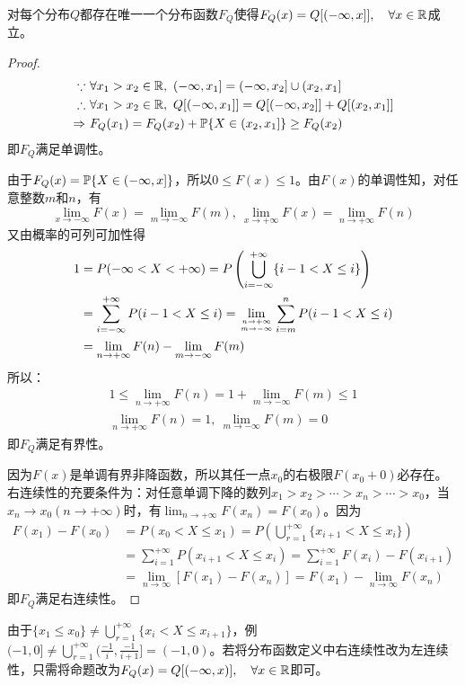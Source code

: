 \begin{proposition}
    对每个分布$Q$都存在唯一一个分布函数$F_Q$使得$F_Q(x)=Q[(-\infty,x]], \quad \forall x \in \R$成立。
\end{proposition}
\begin{proof}
    \begin{align*}
        \because \      & \forall x_1>x_2 \in \mathbb{R},\ (-\infty,x_1]=(-\infty,x_2] \cup (x_2,x_1]     \\
        \therefore \    & \forall x_1>x_2 \in \mathbb{R},\ Q[(-\infty,x_1]]=Q[(-\infty,x_2]]+Q[(x_2,x_1]] \\
        \Rightarrow  \  & F_{Q}(x_1)=F_{Q}(x_2)+\P\{X\in(x_2,x_1]\}\ge F_{Q}(x_2)
    \end{align*}
    即$F_Q$满足单调性。

    由于$F_Q(x)=\P\{X\in(-\infty,x]\}$，所以$ 0\leq F(x)\leq 1 $。由$F(x)$的单调性知，对任意整数$m$和$n$，有
    \[ \lim_{x \rightarrow-\infty} F(x)=\lim_{m \rightarrow-\infty} F(m),\ \lim_{x \rightarrow+\infty} F(x)=\lim_{n \rightarrow+\infty} F(n) \]
    又由概率的可列可加性得
    \begin{align*}
        1 & = P(-\infty<X<+\infty) = P\left(\bigcup_{i=-\infty}^{+\infty}\{i-1<X \leq i\}\right)                                                \\
          & = \sum_{i=-\infty}^{+\infty} P(i-1<X \leq i)=\lim_{n \rightarrow+\infty \atop m \rightarrow-\infty} \sum_{i =m}^{n} P(i-1<X \leq i) \\
          & =\lim_{n \rightarrow+\infty} F(n)-\lim_{m \rightarrow-\infty} F(m)
    \end{align*}
    所以：
    \begin{gather}
        1 \le \lim_{n \rightarrow+\infty} F(n)=1+\lim_{m \rightarrow-\infty} F(m) \le 1 \\
        \lim_{n \rightarrow+\infty} F(n)=1 ,\ \lim_{m \rightarrow-\infty} F(m)=0
    \end{gather}
    即$F_Q$满足有界性。

    因为$F(x)$是单调有界非降函数，所以其任一点$x_0$的右极限$F(x_0+0)$必存在。右连续性的充要条件为：对任意单调下降的数列$x_1>x_2>\cdots>x_n>\cdots>x_0$，当$x_n \rightarrow x_0(n \rightarrow+\infty)$时，有$\lim _{n \rightarrow+\infty} F(x_n)=F(x_0)$。因为
    \begin{align*}
        F(x_1)-F(x_0) & =P(x_0 <X \leq x_1)=P\left(\bigcup_{r=1}^{+\infty}\{x_{i+1}<X \leq x_i\}\right)         \\
                      & =\sum_{i=1}^{+\infty} P(x_{i+1}<X \leq x_i)=\sum_{i=1}^{+\infty}F(x_i)-F(x_{i+1})       \\
                      & =\lim _{n \rightarrow \infty}[F(x_1)-F(x_n)]=F(x_1)-\lim _{n \rightarrow \infty} F(x_n)
    \end{align*}
    即$F_Q$满足右连续性。
\end{proof}
\begin{note}
    由于$\{ x_1 \le x_0 \} \neq \bigcup_{r=1}^{+\infty}\{x_i < X \leq x_{i+1}\}$，例$(-1,0]\neq \bigcup_{r=1}^{+\infty}(\frac{-1}{i},\frac{-1}{i+1}]=(-1,0)$。若将分布函数定义中右连续性改为左连续性，只需将命题改为$F_Q(x)=Q[(-\infty,x)], \quad \forall x \in \R$即可。
\end{note}

